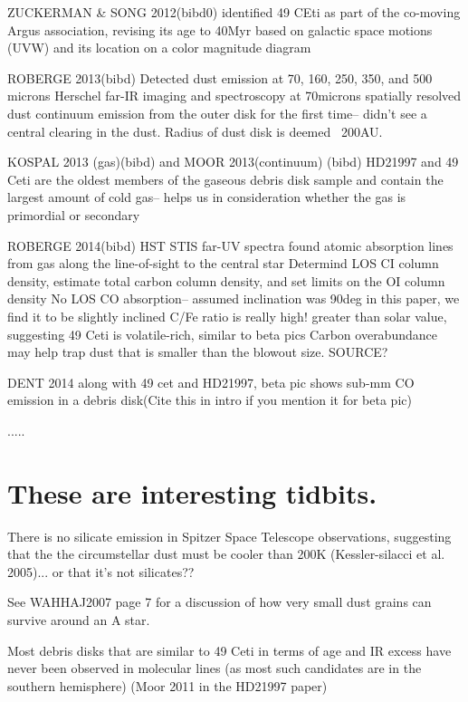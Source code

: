 ZUCKERMAN & SONG 2012(bibd0)
identified 49 CEti as part of the co-moving Argus association, revising its age to 40Myr based on galactic space motions (UVW) and its location on a color magnitude diagram 

ROBERGE 2013(bibd)
Detected dust emission at 70, 160, 250, 350, and 500 microns
Herschel far-IR imaging and spectroscopy at 70microns spatially resolved dust continuum emission from the outer disk for the first time-- didn't see a central clearing in the dust. Radius of dust disk is deemed ~200AU. 

KOSPAL 2013 (gas)(bibd) and MOOR 2013(continuum) (bibd)
HD21997 and 49 Ceti are the oldest members of the gaseous debris disk sample and contain the largest amount of cold gas-- helps us in consideration whether the gas is primordial or secondary


ROBERGE 2014(bibd)
HST STIS far-UV spectra found atomic absorption lines from gas along the line-of-sight to the central star
Determind LOS CI column density, estimate total carbon column density, and set limits on the OI column density
No LOS CO absorption-- assumed inclination was 90deg in this paper, we find it to be slightly inclined
C/Fe ratio is really high! greater than solar value, suggesting 49 Ceti is volatile-rich, similar to beta pics
Carbon overabundance may help trap dust that is smaller than the blowout size. SOURCE?

DENT 2014
along with 49 cet and HD21997, beta pic shows sub-mm CO emission in a debris disk(Cite this in intro if you mention it for beta pic)




.....

\section{These are interesting tidbits.}
There is no silicate emission in Spitzer Space Telescope observations, suggesting that the the circumstellar dust must be cooler than 200K (Kessler-silacci et al. 2005)... or that it's not silicates??

See WAHHAJ2007 page 7 for a discussion of how very small dust grains can survive around an A star. 

Most debris disks that are similar to 49 Ceti in terms of age and IR excess have never been observed in molecular lines (as most such candidates are in the southern hemisphere) (Moor 2011 in the HD21997 paper)



